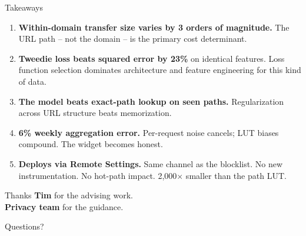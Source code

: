 \documentclass[10pt,aspectratio=169]{beamer}
\begin{document}
\begin{frame}{Takeaways}
    \begin{enumerate}
        \item \textbf{Within-domain transfer size varies by 3 orders of magnitude.} The URL path -- not the domain -- is the primary cost determinant.

        \vspace{0.4em}
        \item \textbf{Tweedie loss beats squared error by 23\%} on identical features. Loss function selection dominates architecture and feature engineering for this kind of data.

        \vspace{0.4em}
        \item \textbf{The model beats exact-path lookup on seen paths.} Regularization across URL structure beats memorization.

        \vspace{0.4em}
        \item \textbf{6\% weekly aggregation error.} Per-request noise cancels; LUT biases compound. The widget becomes honest.

        \vspace{0.4em}
        \item \textbf{Deploys via Remote Settings.} Same channel as the blocklist. No new instrumentation. No hot-path impact. 2{,}000$\times$ smaller than the path LUT.
    \end{enumerate}
\end{frame}

\begin{frame}{Thanks}
    \textbf{Tim} for the advising work. \\
    \textbf{Privacy team} for the guidance.

    \vspace{2em}
    \begin{center}
        \Large{Questions?}
    \end{center}
\end{frame}
\end{document}
